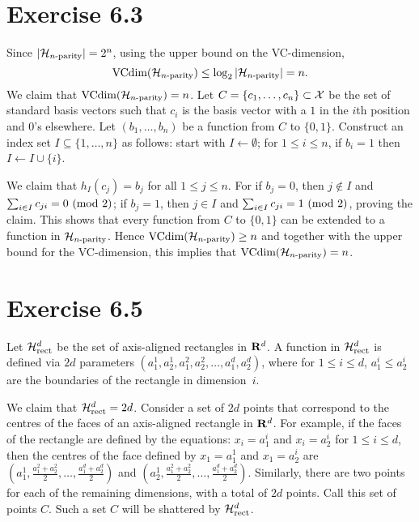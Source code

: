 \section*{Exercise 6.3}

Since $|\mathcal{H}_{n\text{-parity}}| = 2^n$, using the upper bound on the VC-dimension,
\[\text{VCdim} (\mathcal{H}_{n\text{-parity}}) \leq \log_2 |\mathcal{H}_{n\text{-parity}}| = n.\]
We claim that $\text{VCdim} (\mathcal{H}_{n\text{-parity}}) = n$. Let $C = \{c_1, \ldots, c_n\} \subset
\mathcal{X}$ be the set of standard basis vectors such that $c_i$ is the basis
vector with a $1$ in the $i$th position and $0$'s
elsewhere. Let $(b_1, \ldots, b_n)$ be a function from $C$ to $\{0, 1\}$.
Construct an index set $I \subseteq \{1, \ldots, n\}$ as follows:
start with $I \leftarrow \emptyset$; for $1 \leq i \leq n$, if $b_i = 1$
then $I \leftarrow I \cup \{i\}$.

We claim that $h_I(c_j) = b_j$ for all $1 \leq j \leq n$. For if $b_j = 0$,
then $j \notin I$ and $\sum_{i \in I} c_{j i} = 0 \ (\mathrm{mod}\ 2)$; if $b_j = 1$,
then $j \in I$ and $\sum_{i \in I} c_{j i} = 1 \ (\mathrm{mod}\ 2)$, proving the claim.
This shows that every function from $C$ to $\{0, 1\}$ can be extended to a function
in $\mathcal{H}_{n\text{-parity}}$. Hence $\text{VCdim} (\mathcal{H}_{n\text{-parity}}) \geq n$ and together with the upper
bound for the VC-dimension, this implies that $\text{VCdim} (\mathcal{H}_{n\text{-parity}}) = n$.

\section*{Exercise 6.5}

Let $\mathcal{H}_{\text{rect}}^{d}$ be the set of axis-aligned rectangles in $\mathbf{R}^{d}$. A function
in $\mathcal{H}_{\text{rect}}^{d}$ is defined via $2d$ parameters $(a_1^1, a_2^1, a_1^2, a_2^2,
\ldots, a_1^d, a_2^d)$, where for $1 \leq i \leq d$, $a_1^i \leq a_2^i$ are the
boundaries of the rectangle in dimension~$i$.

We claim that $\mathcal{H}_{\text{rect}}^{d} = 2d$. Consider a set of $2d$ points that correspond to
the centres of the faces of an axis-aligned rectangle in $\mathbf{R}^d$. For example,
if the faces of the rectangle are defined by the equations:
$x_i  = a_1^i$ and  $x_i = a_2^i$ for $1 \leq i \leq d$,
then the centres of the face defined by $x_1 = a_1^1$ and $x_1 = a_2^i$ are
$( a_1^1,  \frac{a_1^2 + a_2^2}{2},  \ldots, \frac{a_1^d + a_2^d}{2})$
and $( a_2^1,  \frac{a_1^2 + a_2^2}{2},  \ldots, \frac{a_1^d + a_2^d}{2})$.
Similarly, there are two points for each of the remaining dimensions, with a
total of $2d$ points. Call this set of points $C$. Such a set $C$ will be shattered
by $\mathcal{H}_{\text{rect}}^{d}$.

